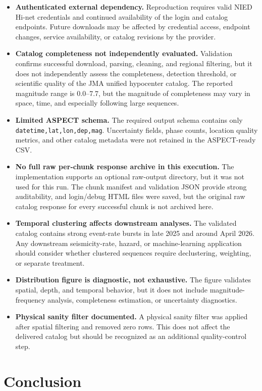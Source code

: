 \documentclass[11pt]{article}
\begin{document}
\begin{itemize}
  \item \textbf{Authenticated external dependency.} Reproduction requires valid NIED Hi-net credentials and continued availability of the login and catalog endpoints. Future downloads may be affected by credential access, endpoint changes, service availability, or catalog revisions by the provider.
  \item \textbf{Catalog completeness not independently evaluated.} Validation confirms successful download, parsing, cleaning, and regional filtering, but it does not independently assess the completeness, detection threshold, or scientific quality of the JMA unified hypocenter catalog. The reported magnitude range is 0.0--7.7, but the magnitude of completeness may vary in space, time, and especially following large sequences.
  \item \textbf{Limited ASPECT schema.} The required output schema contains only \texttt{datetime,lat,lon,dep,mag}. Uncertainty fields, phase counts, location quality metrics, and other catalog metadata were not retained in the ASPECT-ready CSV.
  \item \textbf{No full raw per-chunk response archive in this execution.} The implementation supports an optional raw-output directory, but it was not used for this run. The chunk manifest and validation JSON provide strong auditability, and login/debug HTML files were saved, but the original raw catalog response for every successful chunk is not archived here.
  \item \textbf{Temporal clustering affects downstream analyses.} The validated catalog contains strong event-rate bursts in late 2025 and around April 2026. Any downstream seismicity-rate, hazard, or machine-learning application should consider whether clustered sequences require declustering, weighting, or separate treatment.
  \item \textbf{Distribution figure is diagnostic, not exhaustive.} The figure validates spatial, depth, and temporal behavior, but it does not include magnitude-frequency analysis, completeness estimation, or uncertainty diagnostics.
  \item \textbf{Physical sanity filter documented.} A physical sanity filter was applied after spatial filtering and removed zero rows. This does not affect the delivered catalog but should be recognized as an additional quality-control step.
\end{itemize}

\section{Conclusion}
\end{document}
